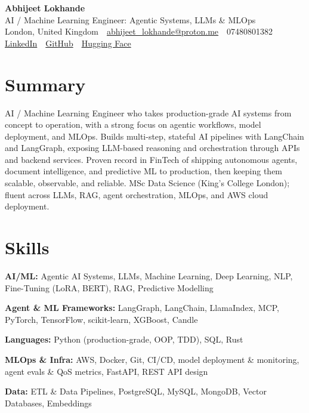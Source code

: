 \documentclass[10pt,a4paper]{article}
\newcommand{\sep}{\,\textcolor{accent!60}{\textbar}\,}
\begin{document}
\begin{center}
  {\fontsize{24}{26}\selectfont\bfseries Abhijeet Lokhande}\\[3pt]
  {\color{accent}\large AI / Machine Learning Engineer: Agentic Systems, LLMs \& MLOps}\\[5pt]
  {\small
    London, United Kingdom \sep
    \href{mailto:abhijeet_lokhande@proton.me}{abhijeet\_lokhande@proton.me} \sep
    07480801382 \\[2pt]
    \href{https://www.linkedin.com/in/ablds/}{LinkedIn} \sep
    \href{https://github.com/abhijeetscode}{GitHub} \sep
    \href{https://huggingface.co/ab-ai}{Hugging Face}
  }
\end{center}
\vspace{2pt}

\section{Summary}
AI / Machine Learning Engineer who takes production-grade AI systems from concept to operation, with a strong focus on agentic workflows, model deployment, and MLOps. Builds multi-step, stateful AI pipelines with LangChain and LangGraph, exposing LLM-based reasoning and orchestration through APIs and backend services. Proven record in FinTech of shipping autonomous agents, document intelligence, and predictive ML to production, then keeping them scalable, observable, and reliable. MSc Data Science (King's College London); fluent across LLMs, RAG, agent orchestration, MLOps, and AWS cloud deployment.

\section{Skills}
\begin{tight}
  \item[\textcolor{accent}{\small$\bullet$}] \textbf{AI/ML:} Agentic AI Systems, LLMs, Machine Learning, Deep Learning, NLP, Fine-Tuning (LoRA, BERT), RAG, Predictive Modelling
  \item[\textcolor{accent}{\small$\bullet$}] \textbf{Agent \& ML Frameworks:} LangGraph, LangChain, LlamaIndex, MCP, PyTorch, TensorFlow, scikit-learn, XGBoost, Candle
  \item[\textcolor{accent}{\small$\bullet$}] \textbf{Languages:} Python (production-grade, OOP, TDD), SQL, Rust
  \item[\textcolor{accent}{\small$\bullet$}] \textbf{MLOps \& Infra:} AWS, Docker, Git, CI/CD, model deployment \& monitoring, agent evals \& QoS metrics, FastAPI, REST API design
  \item[\textcolor{accent}{\small$\bullet$}] \textbf{Data:} ETL \& Data Pipelines, PostgreSQL, MySQL, MongoDB, Vector Databases, Embeddings
\end{tight}
\end{document}
